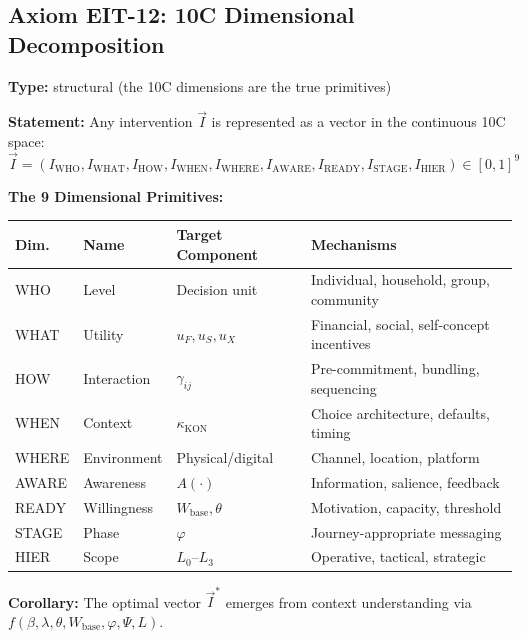 \subsection{Axiom EIT-12: 10C Dimensional Decomposition}

\begin{tcolorbox}[colback=blue!5!white, colframe=blue!75!black,
    title=\textbf{Axiom EIT-12: 10C Dimensional Decomposition}]

\textbf{Type:} structural (the 10C dimensions are the true primitives)

\textbf{Statement:} Any intervention $\vec{I}$ is represented as a vector in the continuous 10C space:
\begin{equation}
\boxed{\vec{I} = (I_{\text{WHO}}, I_{\text{WHAT}}, I_{\text{HOW}}, I_{\text{WHEN}}, I_{\text{WHERE}}, I_{\text{AWARE}}, I_{\text{READY}}, I_{\text{STAGE}}, I_{\text{HIER}}) \in [0,1]^9}
\label{eq:ie-10c-decomp}
\end{equation}

\textbf{The 9 Dimensional Primitives:}
\begin{center}
\renewcommand{\arraystretch}{1.2}
\begin{tabular}{@{}llll@{}}
\toprule
\textbf{Dim.} & \textbf{Name} & \textbf{Target Component} & \textbf{Mechanisms} \\
\midrule
WHO & Level & Decision unit & Individual, household, group, community \\
WHAT & Utility & $u_F, u_S, u_X$ & Financial, social, self-concept incentives \\
HOW & Interaction & $\gamma_{ij}$ & Pre-commitment, bundling, sequencing \\
WHEN & Context & $\kappa_{\text{KON}}$ & Choice architecture, defaults, timing \\
WHERE & Environment & Physical/digital & Channel, location, platform \\
AWARE & Awareness & $A(\cdot)$ & Information, salience, feedback \\
READY & Willingness & $W_{\text{base}}, \theta$ & Motivation, capacity, threshold \\
STAGE & Phase & $\varphi$ & Journey-appropriate messaging \\
HIER & Scope & $L_0$--$L_3$ & Operative, tactical, strategic \\
\bottomrule
\end{tabular}
\end{center}

\textbf{Corollary:} The optimal vector $\vec{I}^*$ emerges from context understanding via $f(\beta, \lambda, \theta, W_{\text{base}}, \varphi, \Psi, L)$.

\end{tcolorbox}


